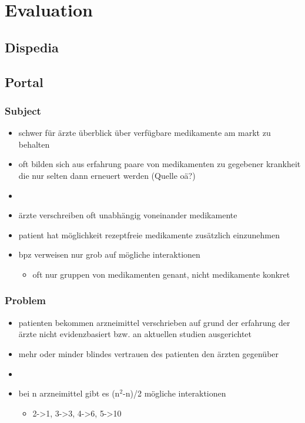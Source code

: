
\chapter{Evaluation}
\label{cha:evaluation}

\section{Dispedia}
\label{sec:dispedia}

\section{Portal}
\label{sec:portal}

\subsection{Subject}
\label{sec-1}

\begin{itemize}
\item schwer für ärzte überblick über verfügbare medikamente am markt zu behalten
\item oft bilden sich aus erfahrung paare von medikamenten zu gegebener krankheit die nur selten dann erneuert werden (Quelle oä?)
\item 
\item ärzte verschreiben oft unabhängig voneinander medikamente
\item patient hat möglichkeit rezeptfreie medikamente zusätzlich einzunehmen
\item bpz verweisen nur grob auf mögliche interaktionen
\begin{itemize}
\item oft nur gruppen von medikamenten genant, nicht medikamente konkret
\end{itemize}
\end{itemize}
\subsection{Problem}
\label{sec-2}

\begin{itemize}
\item patienten bekommen arzneimittel verschrieben auf grund der erfahrung der ärzte nicht evidenzbasiert bzw. an aktuellen studien ausgerichtet
\item mehr oder minder blindes vertrauen des patienten den ärzten gegenüber
\item 
\item bei n arzneimittel gibt es (n$^2$-n)/2 mögliche interaktionen
\begin{itemize}
\item 2->1, 3->3, 4->6, 5->10
\end{itemize}
\end{itemize}
